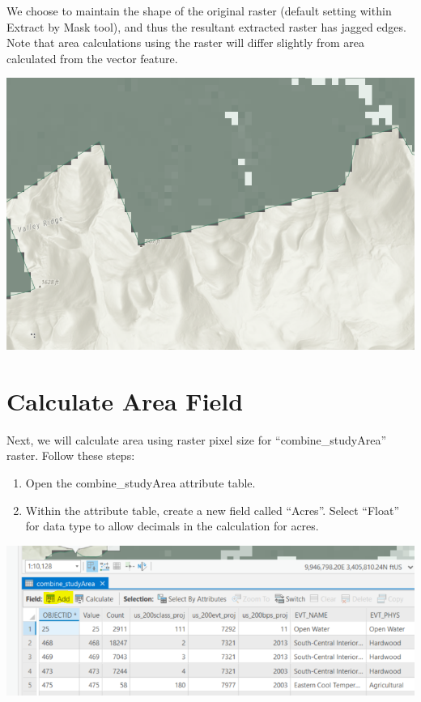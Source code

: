 \documentclass[
]{book}
\providecommand{\tightlist}{%
  \setlength{\itemsep}{0pt}\setlength{\parskip}{0pt}}
\begin{document}
We choose to maintain the shape of the original raster (default setting within Extract by Mask tool), and thus the resultant extracted raster has jagged edges. Note that area calculations using the raster will differ slightly from area calculated from the vector feature.

\includegraphics[width=1000pt]{04_gis_screenshots/13_jagged_edge}

\hypertarget{calculate-area-field}{%
\section{Calculate Area Field}\label{calculate-area-field}}

Next, we will calculate area using raster pixel size for ``combine\_studyArea'' raster. Follow these steps:

\begin{enumerate}
\def\labelenumi{\arabic{enumi}.}
\tightlist
\item
  Open the combine\_studyArea attribute table.
\item
  Within the attribute table, create a new field called ``Acres''. Select ``Float'' for data type to allow decimals in the calculation for acres.
\end{enumerate}

\includegraphics[width=1000pt]{04_gis_screenshots/14_add_acres_field}
\end{document}

